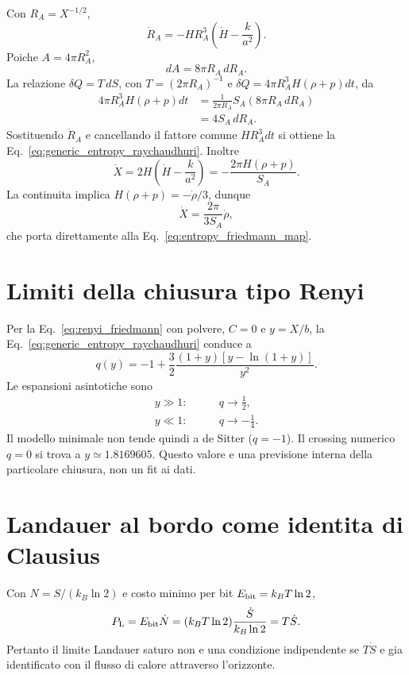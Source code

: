 \documentclass[11pt,a4paper]{article}
\begin{document}
Con $R_A=X^{-1/2}$,
\begin{equation}
 \dot R_A=-H R_A^3\left(\dot H-\frac{k}{a^2}\right).
\end{equation}
Poiche $A=4\pi R_A^2$,
\begin{equation}
 dA=8\pi R_A\,dR_A.
\end{equation}
La relazione $\delta Q=T\,dS$, con $T=(2\pi R_A)^{-1}$ e $\delta Q=4\pi R_A^3H(\rho+p)dt$, da
\begin{align}
4\pi R_A^3H(\rho+p)dt
&=\frac{1}{2\pi R_A}S_A(8\pi R_A\,dR_A)\\
&=4S_A\,dR_A.
\end{align}
Sostituendo $\dot R_A$ e cancellando il fattore comune $HR_A^3dt$ si ottiene la Eq.~\eqref{eq:generic_entropy_raychaudhuri}. Inoltre
\begin{equation}
 \dot X=2H\left(\dot H-\frac{k}{a^2}\right)
 =-\frac{2\pi H(\rho+p)}{S_A}.
\end{equation}
La continuita implica $H(\rho+p)=-\dot\rho/3$, dunque
\begin{equation}
 \dot X=\frac{2\pi}{3S_A}\dot\rho,
\end{equation}
che porta direttamente alla Eq.~\eqref{eq:entropy_friedmann_map}.

\section{Limiti della chiusura tipo Renyi}

Per la Eq.~\eqref{eq:renyi_friedmann} con polvere, $C=0$ e $y=X/b$, la Eq.~\eqref{eq:generic_entropy_raychaudhuri} conduce a
\begin{equation}
 q(y)=-1+\frac32\frac{(1+y)[y-\ln(1+y)]}{y^2}.
\end{equation}
Le espansioni asintotiche sono
\begin{align}
 y\gg1:&\qquad q\to\frac12,\\
 y\ll1:&\qquad q\to-\frac14.
\end{align}
Il modello minimale non tende quindi a de Sitter ($q=-1$). Il crossing numerico $q=0$ si trova a $y\simeq1.8169605$. Questo valore e una previsione interna della particolare chiusura, non un fit ai dati.


\section{Landauer al bordo come identita di Clausius}

Con $N=S/(k_B\ln2)$ e costo minimo per bit $E_{\rm bit}=k_B T\ln2$,
\begin{equation}
 P_{\rm L}=E_{\rm bit}\dot N=(k_B T\ln2)\frac{\dot S}{k_B\ln2}=T\dot S.
\end{equation}
Pertanto il limite Landauer saturo non e una condizione indipendente se $T\dot S$ e gia identificato con il flusso di calore attraverso l'orizzonte.
\end{document}
